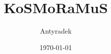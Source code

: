 \documentclass[a4paper]{report}
\newcommand\chapterdir{chapters}
\newcommand{\kosmoramus}{KoSMoRaMuS}
\begin{document}
	\title{\kosmoramus}
	\author{Antyradek}
	\date{\today}
	\maketitle
	\tableofcontents
	
	
\end{document}
